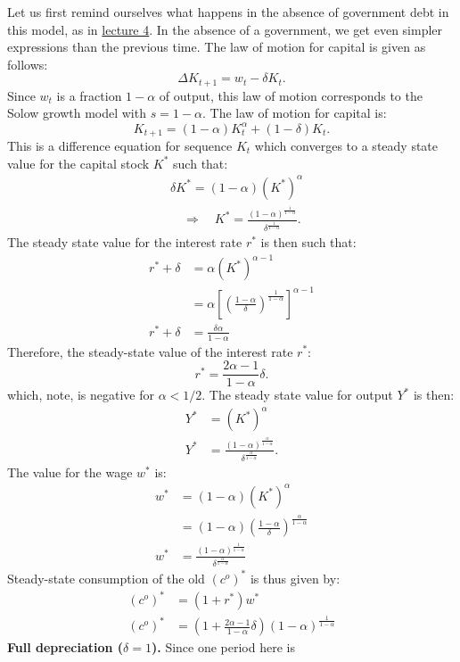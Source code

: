 \documentclass[]{book}
\theoremstyle{definition}
\theoremstyle{definition}
\theoremstyle{definition}
\theoremstyle{remark}
\begin{document}
Let us first remind ourselves what happens in the absence of government
debt in this model, as in \protect\hyperlink{olg}{lecture 4}. In the
absence of a government, we get even simpler expressions than the
previous time. The law of motion for capital is given as follows:
\[\Delta K_{t+1}=w_{t}-\delta K_{t}.\] Since \(w_t\) is a fraction
\(1-\alpha\) of output, this law of motion corresponds to the Solow
growth model with \(s = 1-\alpha\). The law of motion for capital is:
\[K_{t+1}=(1-\alpha) K_{t}^{\alpha}+ (1-\delta)K_t.\] This is a
difference equation for sequence \(K_{t}\) which converges to a steady
state value for the capital stock \(K^{*}\) such that: \[
\begin{aligned}
& \delta K^{*} = (1-\alpha)(K^*)^{\alpha}\\
& \quad \Rightarrow \quad K^{*}=\frac{(1-\alpha)^{\frac{1}{1-\alpha}}}{\delta^{\frac{1}{1-\alpha}}}.
\end{aligned}
\] The steady state value for the interest rate \(r^{*}\) is then such
that: \[
\begin{aligned}
r^{*}+\delta&=\alpha(K^{*})^{\alpha-1}\\
&= \alpha \left[\left(\frac{1-\alpha}{\delta}\right)^{\frac{1}{1-\alpha}}\right]^{\alpha-1}\\
r^{*}+\delta &=\frac{\delta \alpha}{1-\alpha}
\end{aligned}
\] Therefore, the steady-state value of the interest rate \(r^{*}\):
\[r^{*} = \frac{2\alpha-1}{1-\alpha}\delta.\] which, note, is negative
for \(\alpha < 1/2\). The steady state value for output \(Y^{*}\) is
then: \[
\begin{aligned}
Y^{*}&=\left(K^{*}\right)^{\alpha}\\
Y^{*}&=\frac{(1-\alpha)^{\frac{\alpha}{1-\alpha}}}{\delta^{\frac{\alpha}{1-\alpha}}}.
\end{aligned}
\] The value for the wage \(w^{*}\) is: \[
\begin{aligned}
w^{*}&=(1-\alpha)\left(K^{*}\right)^{\alpha}\\
&=(1-\alpha) \left(\frac{1-\alpha}{\delta}\right)^{\frac{\alpha}{1-\alpha}}\\
w^{*} &= \frac{\left(1-\alpha\right)^{\frac{1}{1-\alpha}}}{\delta^{\frac{\alpha}{1-\alpha}}}
\end{aligned}
\] Steady-state consumption of the old \((c^{o})^{*}\) is thus given by:
\[
\begin{aligned}
(c^{o})^{*}&=(1+r^*)w^{*}\\
(c^{o})^{*}&=\left(1+ \frac{2\alpha-1}{1-\alpha}\delta\right)\left(1-\alpha\right)^{\frac{1}{1-\alpha}}
\end{aligned}
\] \textbf{Full depreciation (\(\delta = 1\)).} Since one period here is
\end{document}
